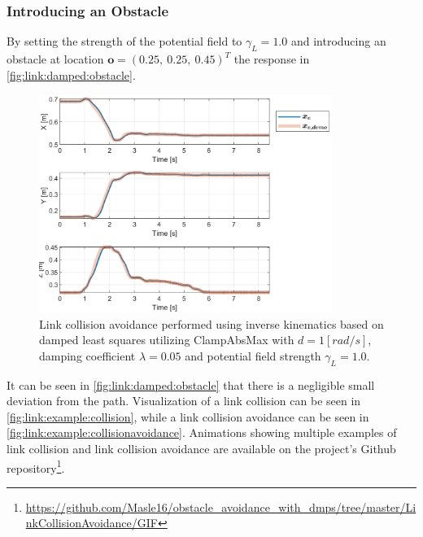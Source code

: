 \documentclass[../main.tex]{subfiles}
\begin{document}
\subsubsection{Introducing an Obstacle}
By setting the strength of the potential field to $\gamma_L = 1.0$ and introducing an obstacle at location $\boldsymbol{o} = (0.25,\ 0.25,\ 0.45)^T$ the response in \autoref{fig:link:damped:obstacle}.
\begin{figure}[H]
    \centering
         \includegraphics[width=0.85\textwidth]{figures/linkcollision/DLS_gamma1.png}
     \caption{Link collision avoidance performed using inverse kinematics based on damped least squares utilizing ClampAbsMax with $d = 1 [rad/s]$, damping coefficient $\lambda = 0.05$ and potential field strength $\gamma_L = 1.0$.}
     \label{fig:link:damped:obstacle}
\end{figure}
It can be seen in \autoref{fig:link:damped:obstacle} that there is a negligible small deviation from the path. Visualization of a link collision can be seen in \autoref{fig:link:example:collision}, while a link collision avoidance can be seen in \autoref{fig:link:example:collisionavoidance}. Animations showing multiple examples of link collision and link collision avoidance are available on the project's Github repository\footnote{\url{https://github.com/Masle16/obstacle_avoidance_with_dmps/tree/master/LinkCollisionAvoidance/GIF}}. 
\end{document}
